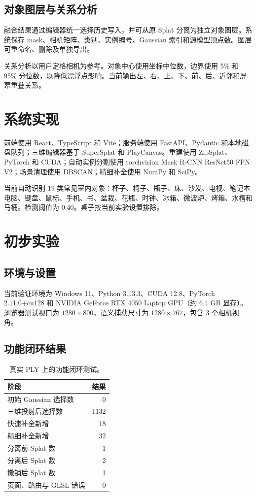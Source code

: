 \documentclass[10pt,twocolumn]{ctexart}
\begin{document}
\subsection{对象图层与关系分析}

融合结果通过编辑器统一选择历史写入，并可从原 Splat 分离为独立对象图层。系统保存 mask、相机矩阵、类别、实例编号、Gaussian 索引和源模型顶点数。图层可重命名、删除及单独导出。

关系分析以用户定格相机为参考。对象中心使用坐标中位数，边界使用 5\% 和 95\% 分位数，以降低漂浮点影响。当前输出左、右、上、下、前、后、近邻和屏幕重叠关系。

\section{系统实现}

前端使用 React、TypeScript 和 Vite；服务端使用 FastAPI、Pydantic 和本地磁盘队列；三维编辑器基于 SuperSplat 和 PlayCanvas。重建使用 ZipSplat、PyTorch 和 CUDA；自动实例分割使用 torchvision Mask R-CNN ResNet50 FPN V2；场景清理使用 DBSCAN；精细补全使用 NumPy 和 SciPy。

当前自动识别 19 类常见室内对象：杯子、椅子、瓶子、床、沙发、电视、笔记本电脑、键盘、鼠标、手机、书、盆栽、花瓶、时钟、冰箱、微波炉、烤箱、水槽和马桶。检测阈值为 0.40。桌子按当前实验设置排除。

\section{初步实验}

\subsection{环境与设置}

当前验证环境为 Windows 11、Python 3.13.3、CUDA 12.8、PyTorch 2.11.0+cu128 和 NVIDIA GeForce RTX 4050 Laptop GPU（约 6.4 GB 显存）。浏览器测试视口为 $1280\times800$，语义捕获尺寸为 $1280\times767$，包含 3 个相机视角。

\subsection{功能闭环结果}

\begin{table}[t]
\centering
\caption{真实 PLY 上的功能闭环测试。}
\label{tab:smoke}
\begin{tabular}{lr}
\toprule
阶段 & 结果\\
\midrule
初始 Gaussian 选择数 & 0\\
三维投射后选择数 & 1132\\
快速补全新增 & 18\\
精细补全新增 & 32\\
分离前 Splat 数 & 1\\
分离后 Splat 数 & 2\\
撤销后 Splat 数 & 1\\
页面、路由与 GLSL 错误 & 0\\
\bottomrule
\end{tabular}
\end{table}
\end{document}
